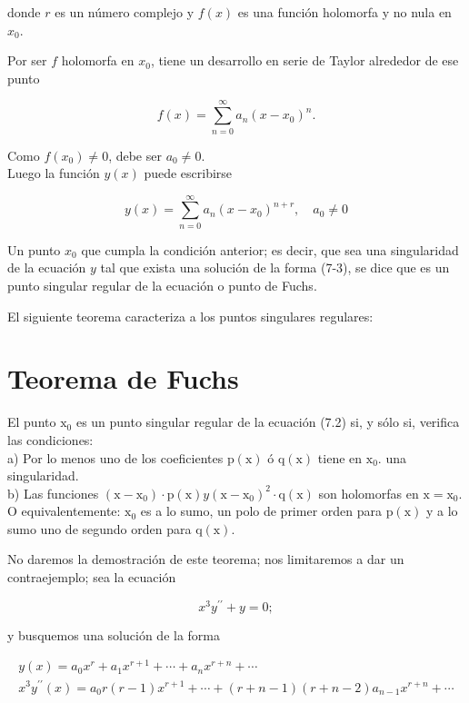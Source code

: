 \documentclass[10pt]{article}
\theoremstyle{plain}
\theoremstyle{definition}
\theoremstyle{remark}
\begin{document}
donde $r$ es un número complejo y $f(x)$ es una función holomorfa y no nula en $x_{0}$.

Por ser $f$ holomorfa en $x_{0}$, tiene un desarrollo en serie de Taylor alrededor de ese punto

$$
f(x)=\sum_{n=0}^{\infty} a_{n}\left(x-x_{0}\right)^{n} .
$$

Como $f\left(x_{0}\right) \neq 0$, debe ser $a_{0} \neq 0$.\\
Luego la función $y(x)$ puede escribirse


\begin{equation*}
y(x)=\sum_{n=0}^{\infty} a_{n}\left(x-x_{0}\right)^{n+r}, \quad a_{0} \neq 0 \tag{7-3}
\end{equation*}


Un punto $x_{0}$ que cumpla la condición anterior; es decir, que sea una singularidad de la ecuación $y$ tal que exista una solución de la forma (7-3), se dice que es un punto singular regular de la ecuación o punto de Fuchs.

El siguiente teorema caracteriza a los puntos singulares regulares:


\section*{Teorema de Fuchs}
El punto $\mathrm{x}_{0}$ es un punto singular regular de la ecuación (7.2) si, y sólo si, verifica las condiciones:\\
a) Por lo menos uno de los coeficientes $\mathrm{p}(\mathrm{x})$ ó $\mathrm{q}(\mathrm{x})$ tiene en $\mathrm{x}_{0}$. una singularidad.\\
b) Las funciones $\left(\mathrm{x}-\mathrm{x}_0\right) \cdot \mathrm{p}(\mathrm{x}) y\left(\mathrm{x}-\mathrm{x}_0\right)^{2} \cdot \mathrm{q}(\mathrm{x})$ son holomorfas en $\mathrm{x}=\mathrm{x}_0$. O equivalentemente: $\mathrm{x}_0$ es a lo sumo, un polo de primer orden para $\mathrm{p}(\mathrm{x})$ y a lo sumo uno de segundo orden para $\mathrm{q}(\mathrm{x})$.

No daremos la demostración de este teorema; nos limitaremos a dar un contraejemplo; sea la ecuación

$$
x^{3} y^{\prime \prime}+y=0 ;
$$

y busquemos una solución de la forma

$$
\begin{gathered}
y(x)=a_{0} x^{r}+a_{1} x^{r+1}+\cdots+a_{n} x^{r+n}+\cdots \\
x^{3} y^{\prime \prime}(x)=a_{0} r(r-1) x^{r+1}+\cdots+(r+n-1)(r+n-2) a_{n-1} x^{r+n}+\cdots
\end{gathered}
$$
\end{document}
